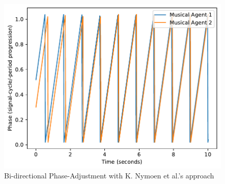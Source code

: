 \begin{figure}[h]
	\centering
	\includegraphics[width=0.9\linewidth]{Assets/Figures/NymoenPhaseAdjustment.pdf}
	\caption{Bi-directional Phase-Adjustment with K. Nymoen et al.'s approach}
	\label{fig:nymoen_phase}
\end{figure}